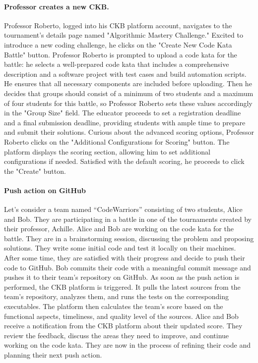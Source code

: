 \paragraph*{Professor creates a new CKB.}
Professor Roberto, logged into his CKB platform account, navigates to the tournament's details page named "Algorithmic Mastery Challenge." 
Excited to introduce a new coding challenge, he clicks on the "Create New Code Kata Battle" button. 
Professor Roberto is prompted to upload a code kata for the battle: he selects a well-prepared code kata that includes a comprehensive description and a software project with test cases and build automation scripts. 
He ensures that all necessary components are included before uploading.
Then he decides that groups should consist of a minimum of two students and a maximum of four students for this battle, so Professor Roberto sets these values accordingly in the "Group Size" field.
The educator proceeds to set a registration deadline and a final submission deadline, providing students with ample time to prepare and submit their solutions.
Curious about the advanced scoring options, Professor Roberto clicks on the "Additional Configurations for Scoring" button. 
The platform displays the scoring section, allowing him to set additional configurations if needed. 
Satisfied with the default scoring, he proceeds to click the "Create" button.

\paragraph*{Push action on GitHub}
Let’s consider a team named “CodeWarriors” consisting of two students, Alice and Bob. 
They are participating in a battle in one of the tournaments created by their professor, Achille. 
Alice and Bob are working on the code kata for the battle. They are in a brainstorming session, discussing the problem and proposing solutions. 
They write some initial code and test it locally on their machines. 
After some time, they are satisfied with their progress and decide to push their code to GitHub. 
Bob commits their code with a meaningful commit message and pushes it to their team’s repository on GitHub. 
As soon as the push action is performed, the CKB platform is triggered. 
It pulls the latest sources from the team’s repository, analyzes them, and runs the tests on the corresponding executables. 
The platform then calculates the team’s score based on the functional aspects, timeliness, and quality level of the sources. 
Alice and Bob receive a notification from the CKB platform about their updated score. 
They review the feedback, discuss the areas they need to improve, and continue working on the code kata. 
They are now in the process of refining their code and planning their next push action.

